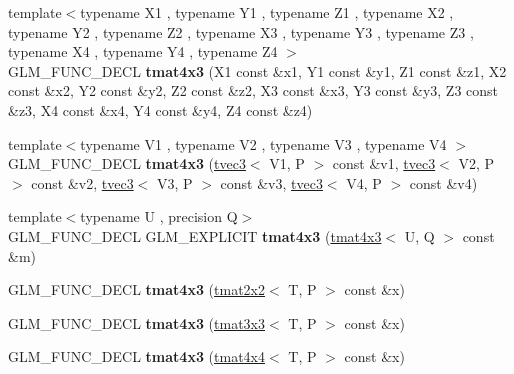 \begin{DoxyCompactItemize}
\item 
\hypertarget{structglm_1_1tmat4x3_a6374ec605f3a745bec999d9dd6926a8d}{{\footnotesize template$<$typename X1 , typename Y1 , typename Z1 , typename X2 , typename Y2 , typename Z2 , typename X3 , typename Y3 , typename Z3 , typename X4 , typename Y4 , typename Z4 $>$ }\\G\-L\-M\-\_\-\-F\-U\-N\-C\-\_\-\-D\-E\-C\-L {\bfseries tmat4x3} (X1 const \&x1, Y1 const \&y1, Z1 const \&z1, X2 const \&x2, Y2 const \&y2, Z2 const \&z2, X3 const \&x3, Y3 const \&y3, Z3 const \&z3, X4 const \&x4, Y4 const \&y4, Z4 const \&z4)}\label{structglm_1_1tmat4x3_a6374ec605f3a745bec999d9dd6926a8d}

\item 
\hypertarget{structglm_1_1tmat4x3_a69caec1d2cb2b9320817a1323211d94d}{{\footnotesize template$<$typename V1 , typename V2 , typename V3 , typename V4 $>$ }\\G\-L\-M\-\_\-\-F\-U\-N\-C\-\_\-\-D\-E\-C\-L {\bfseries tmat4x3} (\hyperlink{structglm_1_1tvec3}{tvec3}$<$ V1, P $>$ const \&v1, \hyperlink{structglm_1_1tvec3}{tvec3}$<$ V2, P $>$ const \&v2, \hyperlink{structglm_1_1tvec3}{tvec3}$<$ V3, P $>$ const \&v3, \hyperlink{structglm_1_1tvec3}{tvec3}$<$ V4, P $>$ const \&v4)}\label{structglm_1_1tmat4x3_a69caec1d2cb2b9320817a1323211d94d}

\item 
\hypertarget{structglm_1_1tmat4x3_aa0103a8d29b63892bf75c1f28cccfe23}{{\footnotesize template$<$typename U , precision Q$>$ }\\G\-L\-M\-\_\-\-F\-U\-N\-C\-\_\-\-D\-E\-C\-L G\-L\-M\-\_\-\-E\-X\-P\-L\-I\-C\-I\-T {\bfseries tmat4x3} (\hyperlink{structglm_1_1tmat4x3}{tmat4x3}$<$ U, Q $>$ const \&m)}\label{structglm_1_1tmat4x3_aa0103a8d29b63892bf75c1f28cccfe23}

\item 
\hypertarget{structglm_1_1tmat4x3_a5a134dfa461d88def4747dab2b9c1ffe}{G\-L\-M\-\_\-\-F\-U\-N\-C\-\_\-\-D\-E\-C\-L {\bfseries tmat4x3} (\hyperlink{structglm_1_1tmat2x2}{tmat2x2}$<$ T, P $>$ const \&x)}\label{structglm_1_1tmat4x3_a5a134dfa461d88def4747dab2b9c1ffe}

\item 
\hypertarget{structglm_1_1tmat4x3_adcbfedae200febbbb716d2942ccb99ce}{G\-L\-M\-\_\-\-F\-U\-N\-C\-\_\-\-D\-E\-C\-L {\bfseries tmat4x3} (\hyperlink{structglm_1_1tmat3x3}{tmat3x3}$<$ T, P $>$ const \&x)}\label{structglm_1_1tmat4x3_adcbfedae200febbbb716d2942ccb99ce}

\item 
\hypertarget{structglm_1_1tmat4x3_a6f0e1d65c68cfef52944cd20b74e2a81}{G\-L\-M\-\_\-\-F\-U\-N\-C\-\_\-\-D\-E\-C\-L {\bfseries tmat4x3} (\hyperlink{structglm_1_1tmat4x4}{tmat4x4}$<$ T, P $>$ const \&x)}\label{structglm_1_1tmat4x3_a6f0e1d65c68cfef52944cd20b74e2a81}


\end{DoxyCompactItemize}
